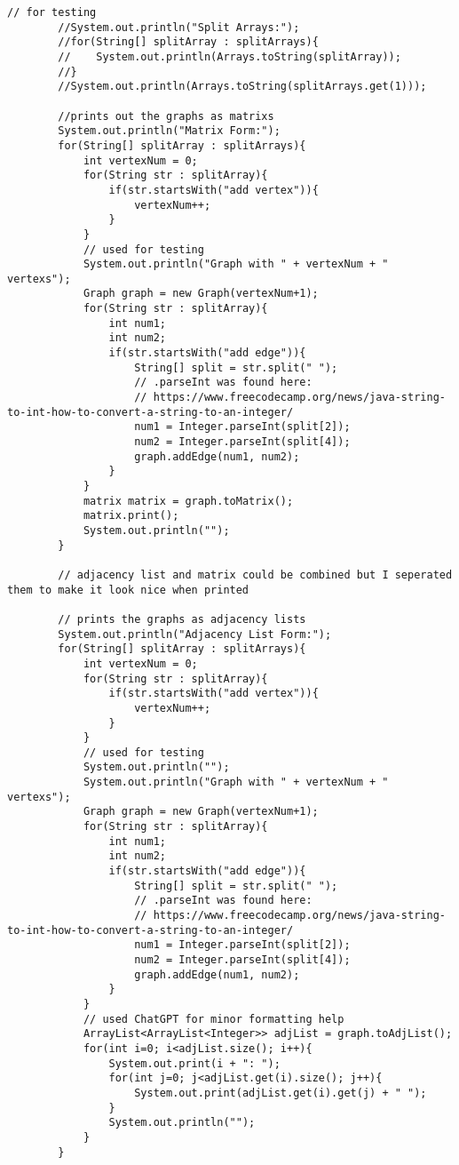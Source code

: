 \documentclass[10pt]{article}
\begin{document}
\begin{lstlisting}[frame=single, ]
        // for testing
        //System.out.println("Split Arrays:");
        //for(String[] splitArray : splitArrays){
        //    System.out.println(Arrays.toString(splitArray));
        //}
        //System.out.println(Arrays.toString(splitArrays.get(1)));

        //prints out the graphs as matrixs
        System.out.println("Matrix Form:");
        for(String[] splitArray : splitArrays){
            int vertexNum = 0;
            for(String str : splitArray){
                if(str.startsWith("add vertex")){
                    vertexNum++;
                }
            }
            // used for testing
            System.out.println("Graph with " + vertexNum + " vertexs");
            Graph graph = new Graph(vertexNum+1);
            for(String str : splitArray){
                int num1;
                int num2;
                if(str.startsWith("add edge")){
                    String[] split = str.split(" ");
                    // .parseInt was found here:
                    // https://www.freecodecamp.org/news/java-string-to-int-how-to-convert-a-string-to-an-integer/
                    num1 = Integer.parseInt(split[2]);
                    num2 = Integer.parseInt(split[4]);
                    graph.addEdge(num1, num2);
                }
            }
            matrix matrix = graph.toMatrix();
            matrix.print();
            System.out.println("");
        }

        // adjacency list and matrix could be combined but I seperated them to make it look nice when printed

        // prints the graphs as adjacency lists
        System.out.println("Adjacency List Form:");
        for(String[] splitArray : splitArrays){
            int vertexNum = 0;
            for(String str : splitArray){
                if(str.startsWith("add vertex")){
                    vertexNum++;
                }
            }
            // used for testing
            System.out.println("");
            System.out.println("Graph with " + vertexNum + " vertexs");
            Graph graph = new Graph(vertexNum+1);
            for(String str : splitArray){
                int num1;
                int num2;
                if(str.startsWith("add edge")){
                    String[] split = str.split(" ");
                    // .parseInt was found here:
                    // https://www.freecodecamp.org/news/java-string-to-int-how-to-convert-a-string-to-an-integer/
                    num1 = Integer.parseInt(split[2]);
                    num2 = Integer.parseInt(split[4]);
                    graph.addEdge(num1, num2);
                }
            }
            // used ChatGPT for minor formatting help
            ArrayList<ArrayList<Integer>> adjList = graph.toAdjList();
            for(int i=0; i<adjList.size(); i++){
                System.out.print(i + ": ");
                for(int j=0; j<adjList.get(i).size(); j++){
                    System.out.print(adjList.get(i).get(j) + " ");
                }
                System.out.println("");
            }
        }


\end{lstlisting}
\end{document}
